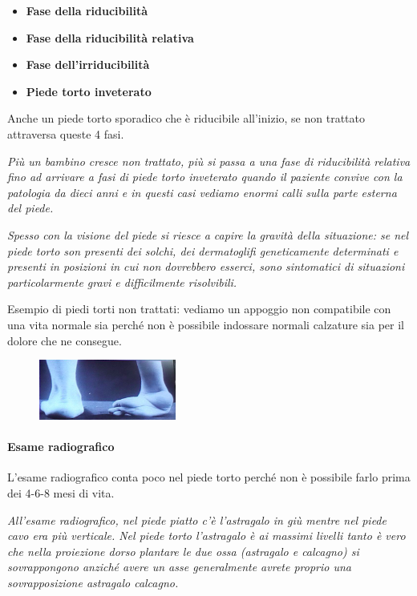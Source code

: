 \begin{itemize}
\item
  \textbf{Fase della riducibilità}
\item
  \textbf{Fase della riducibilità relativa}
\item
  \textbf{Fase dell'irriducibilità}
\item
  \textbf{Piede torto inveterato}
\end{itemize}

Anche un piede torto sporadico che è riducibile all'inizio, se non trattato attraversa queste 4 fasi.

\emph{Più un bambino cresce non trattato, più si passa a una fase di riducibilità relativa fino ad arrivare a fasi di piede torto inveterato quando il paziente convive con la patologia da dieci anni e in questi casi vediamo enormi calli sulla parte esterna del piede.}

\emph{Spesso con la visione del piede si riesce a capire la gravità della situazione: se nel piede torto son presenti dei solchi, dei dermatoglifi geneticamente determinati e presenti in posizioni in cui non dovrebbero esserci, sono sintomatici di situazioni particolarmente
gravi e difficilmente risolvibili.}

Esempio di piedi torti non trattati: vediamo un appoggio non compatibile con una vita normale sia perché non è possibile indossare normali calzature sia per il dolore che ne consegue.

\begin{figure}[!ht]
\centering
\includegraphics[width=0.4\textwidth]{016/image13.png}
\end{figure}

\paragraph{Esame radiografico}

L'esame radiografico conta poco nel piede torto perché non è possibile farlo prima dei 4-6-8 mesi di vita.

\emph{All'esame radiografico, nel piede piatto c'è l'astragalo in giù mentre nel piede cavo era più verticale. Nel piede torto l'astragalo è ai massimi livelli tanto è vero che nella proiezione dorso plantare le due ossa (astragalo e calcagno) si sovrappongono anziché avere un asse generalmente avrete proprio una sovrapposizione astragalo calcagno. }

